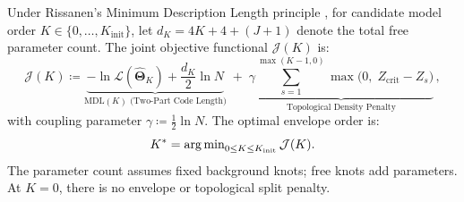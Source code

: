 \begin{definition}
  \label{def:joint_mdl_pak}
  Under Rissanen's Minimum Description Length principle
  \parencite{rissanen1978}, for candidate model order $K \in \{0,
  \dots, K_{\mathrm{init}}\}$, let $d_K = 4K + 4 + (J + 1)$ denote the
  total free parameter count. The joint objective functional
  $\mathcal{J}(K)$ is:
  \begin{equation}
    \mathcal{J}(K) \coloneqq \underbrace{-\ln
      \mathcal{L}(\hat{\bm{\Theta}}_K) + \frac{d_K}{2}\ln
    N}_{\mathrm{MDL}(K) \text{ (Two-Part Code Length)}} \;+\;
    \underbrace{\gamma \sum_{s=1}^{\max(K-1,0)} \max\bigl(0,\;
    Z_{\mathrm{crit}} - Z_s\bigr)}_{\text{Topological Density Penalty}}\,,
    \label{eq:joint_mdl_pak}
  \end{equation}
  with coupling parameter $\gamma \coloneqq \frac{1}{2}\ln N$. The optimal
  envelope order is:
  \begin{equation}
    K^*=\operatorname{arg\,min}_{0\le K\le K_{\mathrm{init}}}\mathcal J(K).
  \end{equation}
  The parameter count assumes fixed background knots; free knots add
  parameters. At $K=0$, there is no envelope or topological split penalty.
\end{definition}

